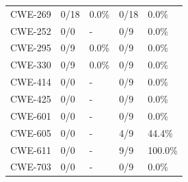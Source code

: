 \begin{table}[t]
\begin{tabular}{lllll}
CWE-269 & 0/18 & 0.0\% & 0/18 & 0.0\% \\
CWE-252 & 0/0 & - & 0/9 & 0.0\% \\
CWE-295 & 0/9 & 0.0\% & 0/9 & 0.0\% \\
CWE-330 & 0/9 & 0.0\% & 0/9 & 0.0\% \\
CWE-414 & 0/0 & - & 0/9 & 0.0\% \\
CWE-425 & 0/0 & - & 0/9 & 0.0\% \\
CWE-601 & 0/0 & - & 0/9 & 0.0\% \\
CWE-605 & 0/0 & - & 4/9 & 44.4\% \\
CWE-611 & 0/0 & - & 9/9 & 100.0\% \\
CWE-703 & 0/0 & - & 0/9 & 0.0\% \\
\bottomrule
\end{tabular}
\end{table}
